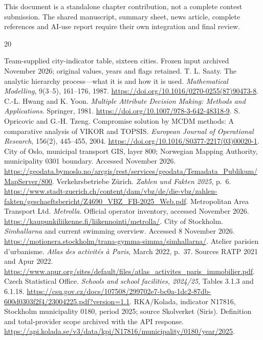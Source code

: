 \documentclass[12pt]{article}
\begin{document}
This document is a standalone chapter contribution, not a complete contest
submission. The shared manuscript, summary sheet, news article, complete
references and AI-use report require their own integration and final review.

\begin{thebibliography}{20}
\raggedright
{} Team-supplied city-indicator table, sixteen cities.
Frozen input archived November 2026; original values, years and flags retained.
 T. L. Saaty. The analytic hierarchy process---what it is and
how it is used. \textit{Mathematical Modelling}, 9(3--5), 161--176, 1987.
\url{https://doi.org/10.1016/0270-0255(87)90473-8}.
 C.-L. Hwang and K. Yoon. \textit{Multiple Attribute Decision
Making: Methods and Applications}. Springer, 1981.
\url{https://doi.org/10.1007/978-3-642-48318-9}.
 S. Opricovic and G.-H. Tzeng. Compromise solution by MCDM
methods: A comparative analysis of VIKOR and TOPSIS.
\textit{European Journal of Operational Research}, 156(2), 445--455, 2004.
\url{https://doi.org/10.1016/S0377-2217(03)00020-1}.
 City of Oslo, municipal transport GIS, layer 800; Norwegian
Mapping Authority, municipality 0301 boundary. Accessed November 2026.
\url{https://geodata.bymoslo.no/arcgis/rest/services/geodata/Temadata_Publikum/MapServer/800}.
 Verkehrsbetriebe Z\"urich. \textit{Zahlen und Fakten 2025}, p.~6.
\url{https://www.stadt-zuerich.ch/content/dam/vbz/de/die-vbz/zahlen-fakten/geschaeftsbericht/Z4690_VBZ_FB-2025_Web.pdf}.
 Metropolitan Area Transport Ltd. \textit{Metrolla}.
Official operator inventory, accessed November 2026.
\url{https://kaupunkiliikenne.fi/liikennointi/metrolla/}.
 City of Stockholm. \textit{Simhallarna} and current swimming
overview. Accessed 8 November 2026.
\url{https://motionera.stockholm/trana-gymma-simma/simhallarna/}.
 Atelier parisien d'urbanisme. \textit{Atlas des activit\'es \`a
Paris}, March 2022, p.~37. Sources RATP 2021 and Apur 2022.
\url{https://www.apur.org/sites/default/files/atlas_activites_paris_immobilier.pdf}.
 Czech Statistical Office. \textit{Schools and school facilities,
2024/25}, Tables 3.1.3 and 6.1.18.
\url{https://csu.gov.cz/docs/107508/299702e7-bc0a-1dc2-87db-600d0303f2f4/23004225.pdf?version=1.1}.
 RKA/Kolada, indicator N17816, Stockholm municipality 0180,
period 2025; source Skolverket (Siris). Definition and total-provider scope
archived with the API response.
\url{https://api.kolada.se/v3/data/kpi/N17816/municipality/0180/year/2025}.

\end{thebibliography}
\end{document}
